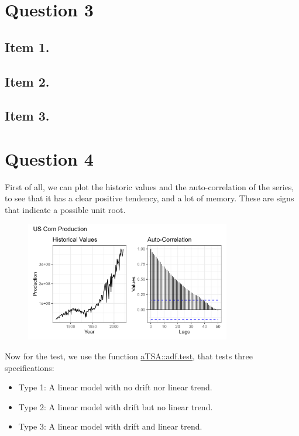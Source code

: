 \documentclass[12pt]{article}
\begin{document}
\section*{Question 3}

\subsection*{Item 1.}

\subsection*{Item 2.}

\subsection*{Item 3.}



\section*{Question 4}

First of all, we can plot the historic values and the auto-correlation of the series, to see that it has a clear positive tendency, and a lot of memory. These are signs that indicate a possible unit root.

\begin{figure}[H]
    \centering
    \includegraphics[width=0.8\textwidth]{figures/corn_prod.png}
\end{figure}

Now for the test, we use the function \href{https://rdrr.io/cran/aTSA/man/adf.test.html}{aTSA::adf.test}, that tests three specifications:

\begin{itemize}
    \item Type 1: A linear model with no drift nor linear trend.
    \item Type 2: A linear model with drift but no linear trend.
    \item Type 3: A linear model with drift and linear trend.
\end{itemize}
\end{document}
